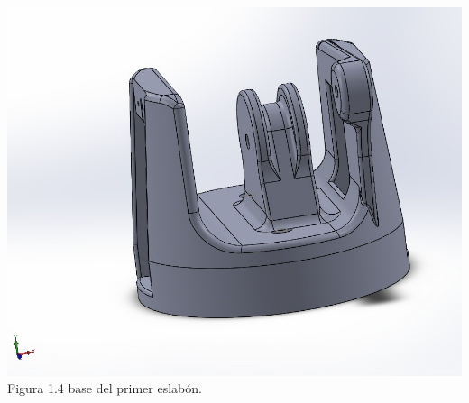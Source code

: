 \documentclass[12pt,a4paper]{article}
\begin{document}
\newpage
\includegraphics[scale=0.7]{base4.jpg} 
\\
Figura 1.4 base del primer eslabón.
\end{document}
